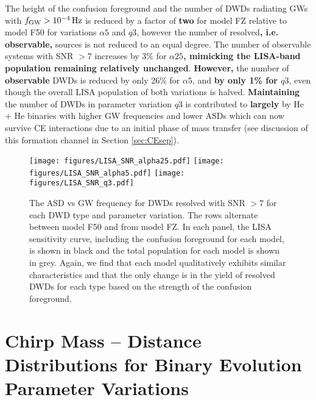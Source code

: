 \documentclass[twocolumn, linenumbers]{aastex631}
\begin{document}
The height of the confusion foreground and the number of DWDs radiating GWs with $f_{\rm{GW}} > 10^{-4}\,\rm{Hz}$ is reduced by a factor of \textbf{two} for model FZ relative to model F50 for variations $\alpha5$ and $q3$, however the number of resolved\textbf{, i.e. observable,} sources is not reduced to an equal degree. The number of observable systems with SNR $>7$ increases by 3\% for $\alpha25$\textbf{, mimicking the LISA-band population remaining relatively unchanged}. \textbf{However, }the number of \textbf{observable} DWDs is reduced by only 26\% for $\alpha5$, and \textbf{by only 1\% for $q3$}, even though the overall LISA population of both variations is halved. \textbf{Maintaining} the number of DWDs in parameter variation $q3$ is contributed to \textbf{largely} by He + He binaries with higher GW frequencies and lower ASDs which can now survive CE interactions due to an initial phase of mass transfer (see discussion of this formation channel in Section \ref{sec:CEsep}).

\begin{figure*}[h]
    \centering
	\texttt{[image: figures/LISA\_SNR\_alpha25.pdf]}
	\texttt{[image: figures/LISA\_SNR\_alpha5.pdf]}
	\texttt{[image: figures/LISA\_SNR\_q3.pdf]}
    \caption{The ASD vs GW frequency for DWDs resolved with SNR $> 7$ for each DWD type and parameter variation. The rows alternate between model F50 and from model FZ. In each panel, the LISA sensitivity curve, including the confusion foreground for each model, is shown in black and the total population for each model is shown in grey. Again, we find that each model qualitatively exhibits similar characteristics and that the only change is in the yield of resolved DWDs for each type based on the strength of the confusion foreground.}
    \label{fig:LISA_SNR_vars}

\end{figure*}

\section{Chirp Mass -- Distance Distributions for Binary Evolution Parameter Variations}\label{appendix:Mc_dist_vars}
\end{document}

